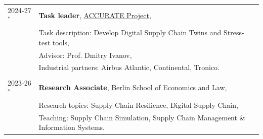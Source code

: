 
\begin{longtable}[l]{@{}p{} p{}}

    2024-27$^*$ & \textbf{Task leader}, \href{https://accurateproject.eu/}{ACCURATE Project}, \\
    & Task description: Develop Digital Supply Chain Twins and Stress-test tools, \\
    & Advisor: Prof. Dmitry Ivanov, \\
    & Industrial partners: Airbus Atlantic, Continental, Tronico. \\\\

    2023-26$^*$ & \textbf{Research Associate}, Berlin School of Economics and Law,\\
    & Research topics: Supply Chain Resilience, Digital Supply Chain, \\
    & Teaching: Supply Chain Simulation, Supply Chain Management \& Information Systems.
    
\end{longtable}



